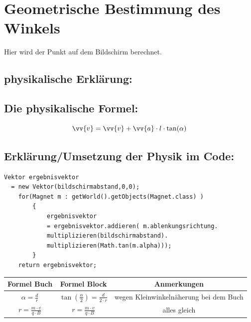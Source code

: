 \section{Geometrische Bestimmung des Winkels}

Hier wird der Punkt auf dem Bildschirm berechnet.
\subsection{physikalische Erklärung:}
\subsection{Die physikalische Formel:}
$$ \vv{v} = \vv{v} + \vv{a} \cdot l \cdot \tan(\alpha)$$
\subsection{Erklärung/Umsetzung der Physik im Code:}
\begin{lstlisting}
Vektor ergebnisvektor 
  = new Vektor(bildschirmabstand,0,0);
    for(Magnet m : getWorld().getObjects(Magnet.class) )
        {
            ergebnisvektor 
            = ergebnisvektor.addieren( m.ablenkungsrichtung.
            multiplizieren(bildschirmabstand).
            multiplizieren(Math.tan(m.alpha)));
        }
    return ergebnisvektor;
\end{lstlisting}

\begin{tabular}{c|c|c}
     Formel Buch & Formel Block & Anmerkungen  \\
     \hline
    $\alpha = \frac{d}{r}$ &$\tan(\frac{\alpha}{2}) = \frac{d}{2\cdot r}$& wegen Kleinwinkelnäherung bei dem Buch \\
    \hline
   $r = \frac{m\cdot v}{q\cdot B}$  & $r = \frac{m\cdot v}{q\cdot B}$& alles gleich 
     
\end{tabular}













 
